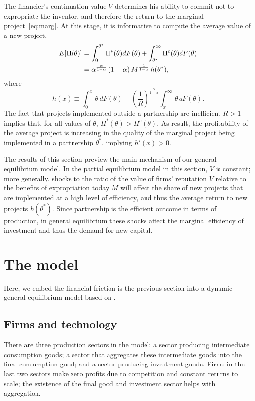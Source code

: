 \documentclass[12pt]{article}
\newcommand{\cn}{\citet}
\begin{document}
The financier's continuation value $V$ determines his ability to commit not to expropriate the inventor, and therefore the return to the marginal project~\eqref{eq:marg}. At this stage, it is informative to compute the average value of a new project,
\begin{align}\notag
E[ \Pi(\theta)] & = \int_0^{\theta^*}  \Pi^*(\theta) d F(\theta)  + \int_{\theta^*}^\infty  \Pi^c(\theta) d F(\theta) \\
& = \alpha^{\frac{\alpha}{1-\alpha}}\,(1-\alpha)\,M^{\frac{1}{1-\alpha}} \, h(\theta^*),
\end{align}
where
\begin{equation}\label{eqn:h}
h(x)\equiv\int_0^{x} \, \theta \,d F(\theta) +  \left(\frac{1}{R}\right)^{\frac{\alpha}{1-\alpha}} \int_{x}^\infty \, \theta \, d F(\theta).
\end{equation}
The fact that projects implemented outside a partnership are inefficient $R>1$ implies that, for all values of $\theta$, $\Pi^*(\theta) > \Pi^c(\theta)$. As result, the profitability of the average project is increasing in the quality of the marginal project being implemented in a partnership $\theta^*$, implying $h'(x)>0$.

The results of this section preview the main mechanism of our general equilibrium model. In the partial equilibrium model in this section, $V$ is constant; more generally, shocks to the ratio of the value of firms' reputation $V$ relative to the benefits of expropriation today $M$ will affect the share of new projects that are implemented at a high level of efficiency, and thus the average return to new projects $h(\theta^*)$. Since partnership is the efficient outcome in terms of production, in general equilibrium these shocks affect the marginal efficiency of investment and thus the demand for new capital.


\section{The model} \label{sec:model}

Here, we embed the financial friction is the previous section into a  dynamic general equilibrium model based on \cn{KPS2013}.

\subsection{Firms and technology}

There are three production sectors in the model: a sector producing intermediate consumption goods; a sector that aggregates these intermediate goods into the final consumption good; and a sector producing investment goods. Firms in the last two sectors make zero profits due to competition and constant returns to scale; the existence of the final good and investment sector helps with aggregation.
\end{document}
